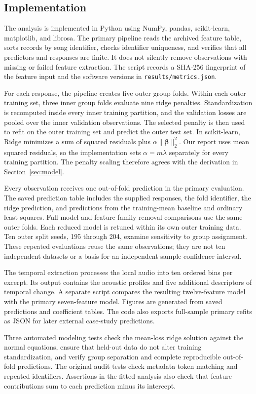 \subsection{Implementation}

The analysis is implemented in Python using NumPy, pandas, scikit-learn, matplotlib, and librosa. The primary pipeline reads the archived feature table, sorts records by song identifier, checks identifier uniqueness, and verifies that all predictors and responses are finite. It does not silently remove observations with missing or failed feature extraction. The script records a SHA-256 fingerprint of the feature input and the software versions in \texttt{results/metrics.json}.

For each response, the pipeline creates five outer group folds. Within each outer training set, three inner group folds evaluate nine ridge penalties. Standardization is recomputed inside every inner training partition, and the validation losses are pooled over the inner validation observations. The selected penalty is then used to refit on the outer training set and predict the outer test set. In scikit-learn, Ridge minimizes a sum of squared residuals plus $\alpha\|\bm\beta\|_2^2$. Our report uses mean squared residuals, so the implementation sets $\alpha=m\lambda$ separately for every training partition. The penalty scaling therefore agrees with the derivation in Section~\ref{sec:model}.

Every observation receives one out-of-fold prediction in the primary evaluation. The saved prediction table includes the supplied responses, the fold identifier, the ridge prediction, and predictions from the training-mean baseline and ordinary least squares. Full-model and feature-family removal comparisons use the same outer folds. Each reduced model is retuned within its own outer training data. Ten outer split seeds, 195 through 204, examine sensitivity to group assignment. These repeated evaluations reuse the same observations; they are not ten independent datasets or a basis for an independent-sample confidence interval.

The temporal extraction processes the local audio into ten ordered bins per excerpt. Its output contains the acoustic profiles and five additional descriptors of temporal change. A separate script compares the resulting twelve-feature model with the primary seven-feature model. Figures are generated from saved predictions and coefficient tables. The code also exports full-sample primary refits as JSON for later external case-study predictions.

Three automated modeling tests check the mean-loss ridge solution against the normal equations, ensure that held-out data do not alter training standardization, and verify group separation and complete reproducible out-of-fold predictions. The original audit tests check metadata token matching and repeated identifiers. Assertions in the fitted analysis also check that feature contributions sum to each prediction minus its intercept.

